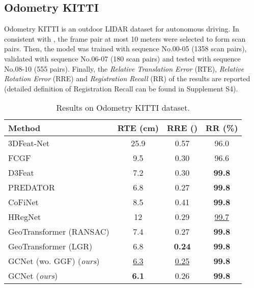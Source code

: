 \documentclass[10pt,twocolumn,letterpaper]{article}
\begin{document}
\subsection{Odometry KITTI}



Odometry KITTI\cite{geiger2012we} is an outdoor LIDAR dataset for autonomous driving. In consistent with \cite{huang2021predator}, the frame pair at most 10 meters were selected to form scan pairs. Then, the model was trained with sequence No.00-05 (1358 scan pairs), validated with sequence No.06-07 (180 scan pairs) and tested with sequence No.08-10 (555 pairs). Finally, the {\em Relative Translation Error} (RTE), {\em Relative Rotation Error} (RRE) and {\em Registration Recall} (RR) of the results are reported (detailed definition of Registration Recall can be found in Supplement S4). 

\begin{table}[t]
\setlength{\tabcolsep}{1pt}
\centering\footnotesize
\begin{tabular}{l|ccc}
\toprule
Method & RTE (cm)  & RRE ()  & RR (\%)  \\
\midrule
3DFeat-Net\cite{yew20183dfeat} & 25.9 & 0.57 & 96.0 \\
FCGF\cite{choy2019fully} & 9.5 & 0.30 & 96.6 \\
D3Feat\cite{bai2020d3feat} & 7.2 & 0.30 & {\bf 99.8} \\
PREDATOR\cite{huang2021predator} & 6.8 & 0.27 & {\bf 99.8} \\
CoFiNet\cite{yu2021cofinet} & 8.5 & 0.41 & {\bf 99.8} \\
HRegNet\cite{lu2021hregnet} & 12 & 0.29 & \underline{99.7} \\
GeoTransformer\cite{qin2022geometric} (RANSAC) & 7.4 & 0.27 & {\bf 99.8} \\
GeoTransformer\cite{qin2022geometric} (LGR) & 6.8 & {\bf 0.24} & {\bf 99.8} \\
\midrule
GCNet (wo. GGF) ({\em ours}) & \underline{6.3} & \underline{0.25} & {\bf 99.8} \\
GCNet ({\em ours}) & {\bf 6.1} & 0.26 & {\bf 99.8} \\
\bottomrule
\end{tabular}
\vspace{-.5em}
\caption{Results on Odometry KITTI dataset.}
\vspace{-1.75em}
\label{tab:kitti}
\end{table}

\vspace{-.5em}
\end{document}
